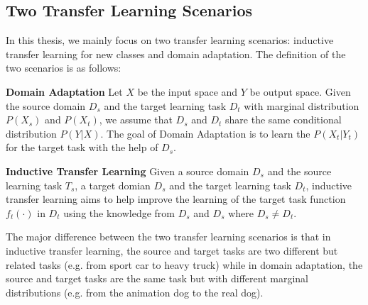 \subsection{Two Transfer Learning Scenarios}
In this thesis, we mainly focus on two transfer learning scenarios: inductive transfer learning for new classes and domain adaptation. The definition of the two scenarios is as follows:
\begin{definition}{\textbf{Domain Adaptation}}
	Let $X$ be the input space and $Y$ be output space. Given the source domain $D_s$ and the target learning task $D_t$ with marginal distribution $P(X_s)$ and $P(X_t)$, we assume that $D_s$ and $D_t$ share the same conditional distribution $P(Y|X)$. The goal of Domain Adaptation is to learn the $P(X_t|Y_t)$ for the target task with the help of $D_s$.
\end{definition}

\begin{definition}{\textbf{Inductive Transfer Learning}}\cite{pan2010survey}
	Given a source domain $D_s$ and the source learning task $T_s$, a target domian $D_s$ and the target learning task $D_t$, inductive transfer learning aims to help improve the learning of the target task function $f_t(\cdot)$ in $D_t$ using the knowledge from $D_s$ and $D_s$ where $D_s \neq D_t$.
\end{definition}

The major difference between the two transfer learning scenarios is that in inductive transfer learning, the source and target tasks are two different but related tasks (e.g. from sport car to heavy truck) while in domain adaptation, the source and target tasks are the same task but with different marginal distributions (e.g. from the animation dog to the real dog). 

